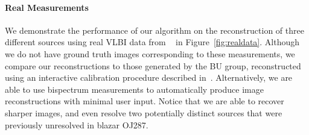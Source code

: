  
 
\vspace{-.2in}
\paragraph{Real Measurements} 

We demonstrate the performance of our algorithm on the reconstruction of three different sources using real VLBI data from
~\cite{jorstad2005polarimetric} in Figure~\ref{fig:realdata}.
Although we do not have ground truth images corresponding to these measurements, we compare our reconstructions to those generated by the BU group,
reconstructed using an interactive calibration procedure described in~\cite{jorstad2005polarimetric}.
Alternatively, we are able to use bispectrum measurements to automatically produce image reconstructions with minimal user input. Notice that we are able to recover sharper images, and even resolve two potentially distinct sources that were previously unresolved in blazar OJ287. 





